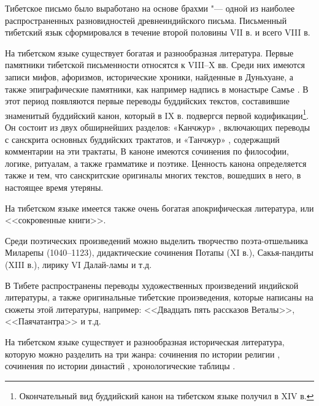 Тибетское письмо было выработано на основе брахми "--- одной из наиболее распространенных разновидностей древнеиндийского письма. Письменный тибетский язык сформировался в течение второй половины VII в. и всего VIII в.

На тибетском языке существует богатая и разнообразная литература. Первые памятники тибетской письменности относятся к VIII--X вв. Среди них имеются записи мифов, афоризмов, исторические хроники, найденные в Дуньхуане, а также эпиграфические памятники, как например надпись в монастыре Самъе . В этот период появляются первые переводы буддийских текстов, составившие знаменитый буддийский канон, который в IX в. подвергся первой кодификации\footnote[2]{Окончательный вид буддийский канон на тибетском языке получил в XIV в.}. Он состоит из двух обширнейших разделов: «Канчжур» , включающих переводы с санскрита основных буддийских трактатов, и «Танчжур» , содержащий комментарии на эти трактаты, В каноне имеются сочинения по философии, логике, ритуалам, а также грамматике и поэтике. Ценность канона определяется также и тем, что санскритские оригиналы многих текстов, вошедших в него, в настоящее время утеряны.

На тибетском языке имеется также очень богатая апокрифическая литература, или <<сокровенные книги>>.

Среди поэтических произведений можно выделить творчество поэта-отшельника Миларепы (1040--1123), дидактические сочинения Потапы (XI в.), Сакья-пандиты (XIII в.), лирику VI Далай-ламы и т.д.

В Тибете распространены переводы художественных произведений индийской литературы, а также оригинальные тибетские проиэведения, которые написаны на сюжеты этой литературы, например: <<Двадцать пять рассказов Веталы>>, <<Паячатантра>> и т.д.

На тибетском языке существует и разнообразная историческая литература, которую можно разделить на три жанра: сочинения по истории религии , сочинения по истории династий , хронологические таблицы .

